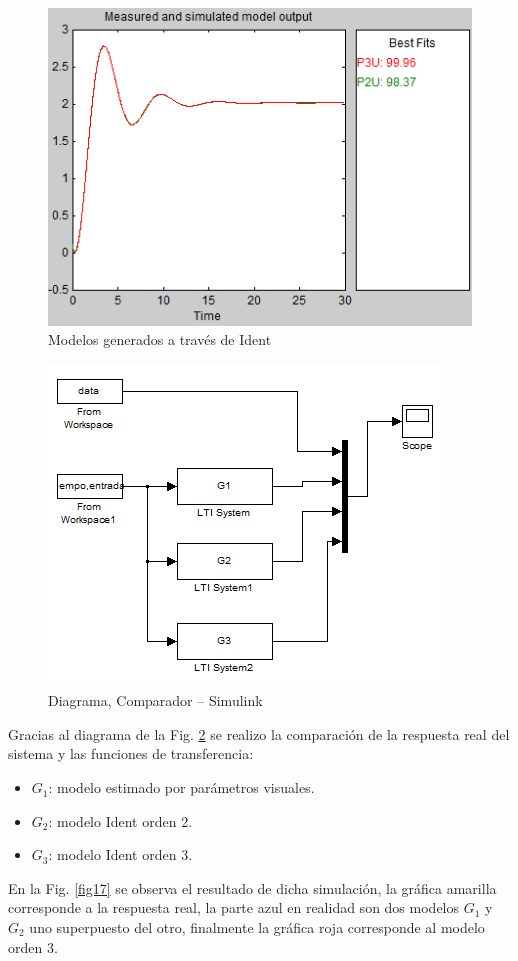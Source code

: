 \documentclass[twocolumn]{IEEEtran}
\begin{document}
\begin{figure}[H]
	\centering
		\includegraphics[scale=0.5]{figure15.png}
	\caption{Modelos generados a través de Ident}
	\label{fig15}
\end{figure}
\begin{figure}[H]
	\centering
		\includegraphics[scale=0.5]{figure16.png}
	\caption{Diagrama, Comparador – Simulink}
	\label{fig16}
\end{figure}
\noindent
Gracias al diagrama de la Fig. \ref{fig16} se realizo la comparación de la respuesta real del sistema y las funciones de transferencia:
\begin{itemize}
 \item $G_1$: modelo estimado por parámetros visuales.
 \item $G_2$: modelo Ident orden $2$.
 \item $G_3$: modelo Ident orden $3$.
\end{itemize}
\noindent
En la Fig. \ref{fig17} se observa el resultado de dicha simulación, la gráfica amarilla corresponde a la respuesta real, la parte azul en realidad son dos modelos $G_1$ y $G_2$ uno superpuesto del otro, finalmente la gráfica roja corresponde al modelo orden $3$.\\
\end{document}
